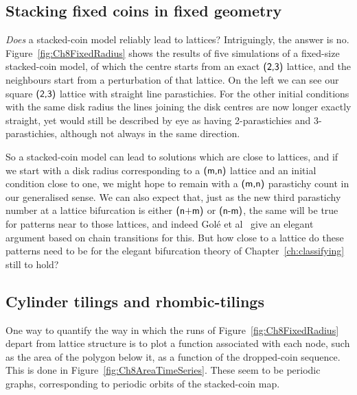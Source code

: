 \clearpage

\subsection{Stacking fixed coins in fixed geometry}

 \textit{Does} a stacked-coin model reliably lead to lattices? Intriguingly, the answer is no. 
 Figure~\ref{fig:Ch8FixedRadius} shows the results of five simulations of a fixed-size stacked-coin model, of which the centre starts from an exact $\textsf{(2,3)}$ lattice, and the neighbours start from a perturbation of that lattice.
On the left we can see our square $\textsf{(2,3)}$ lattice with straight line parastichies. For the other initial conditions with the same disk radius the lines joining the disk centres are now longer exactly straight, yet would still be described by eye as having 2-parastichies and 3-parastichies, although not always in the same direction.

 So a stacked-coin model can lead to solutions which are close to lattices, and if we start with a disk radius corresponding to a $\textsf{(m,n)}$ lattice and an initial condition close to one, we might  hope to remain with a $\textsf{(m,n)}$ parastichy count in our generalised sense. We can also expect that, just as the new third parastichy number at a lattice bifurcation is either $\textsf{(n+m)}$ or $\textsf{(n-m)}$, the same will be true for patterns near to those lattices, and indeed Golé et al~\cite{goleFibonacciQuasisymmetricPhyllotaxis2016} give an elegant argument based on chain transitions for this. But how close to a lattice do these patterns need to be for  the  elegant bifurcation theory of Chapter~\ref{ch:classifying} still to hold? 


\clearpage
\subsection{Cylinder tilings and rhombic-tilings}
\label{sec:tilings}
One way to quantify the way in which the runs of Figure~\ref{fig:Ch8FixedRadius} depart from lattice structure is to plot a function associated with each node, such as the area of the polygon below it,  as a function of the dropped-coin sequence. This is done in Figure~\ref{fig:Ch8AreaTimeSeries}.
These seem to be periodic graphs, corresponding to periodic orbits of the stacked-coin map. 

